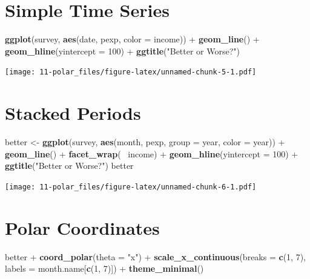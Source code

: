 \documentclass[]{book}
\newenvironment{Shaded}{\begin{snugshade}}{\end{snugshade}}
\newcommand{\KeywordTok}[1]{\textcolor[rgb]{0.13,0.29,0.53}{\textbf{{#1}}}}
\newcommand{\DataTypeTok}[1]{\textcolor[rgb]{0.13,0.29,0.53}{{#1}}}
\newcommand{\DecValTok}[1]{\textcolor[rgb]{0.00,0.00,0.81}{{#1}}}
\newcommand{\StringTok}[1]{\textcolor[rgb]{0.31,0.60,0.02}{{#1}}}
\newcommand{\NormalTok}[1]{{#1}}
\theoremstyle{definition}
\theoremstyle{definition}
\theoremstyle{remark}
\begin{document}
\section{Simple Time Series}\label{simple-time-series}

\begin{Shaded}
\begin{Highlighting}[]
\KeywordTok{ggplot}\NormalTok{(survey, }\KeywordTok{aes}\NormalTok{(date, pexp, }\DataTypeTok{color =} \NormalTok{income)) +}\StringTok{ }
\StringTok{  }\KeywordTok{geom_line}\NormalTok{() +}\StringTok{ }
\StringTok{  }\KeywordTok{geom_hline}\NormalTok{(}\DataTypeTok{yintercept =} \DecValTok{100}\NormalTok{) +}
\StringTok{  }\KeywordTok{ggtitle}\NormalTok{(}\StringTok{"Better or Worse?"}\NormalTok{)}
\end{Highlighting}
\end{Shaded}

\texttt{[image: 11-polar\_files/figure-latex/unnamed-chunk-5-1.pdf]}

\section{Stacked Periods}\label{stacked-periods}

\begin{Shaded}
\begin{Highlighting}[]
\NormalTok{better <-}\StringTok{ }\KeywordTok{ggplot}\NormalTok{(survey, }\KeywordTok{aes}\NormalTok{(month, pexp, }\DataTypeTok{group =} \NormalTok{year, }\DataTypeTok{color =} \NormalTok{year)) +}
\StringTok{  }\KeywordTok{geom_line}\NormalTok{() +}\StringTok{ }
\StringTok{  }\KeywordTok{facet_wrap}\NormalTok{(~}\StringTok{ }\NormalTok{income) +}
\StringTok{  }\KeywordTok{geom_hline}\NormalTok{(}\DataTypeTok{yintercept =} \DecValTok{100}\NormalTok{) +}
\StringTok{  }\KeywordTok{ggtitle}\NormalTok{(}\StringTok{"Better or Worse?"}\NormalTok{)}
\NormalTok{better}
\end{Highlighting}
\end{Shaded}

\texttt{[image: 11-polar\_files/figure-latex/unnamed-chunk-6-1.pdf]}

\section{Polar Coordinates}\label{polar-coordinates}

\begin{Shaded}
\begin{Highlighting}[]
\NormalTok{better +}\StringTok{ }
\StringTok{  }\KeywordTok{coord_polar}\NormalTok{(}\DataTypeTok{theta =} \StringTok{"x"}\NormalTok{) +}\StringTok{ }
\StringTok{  }\KeywordTok{scale_x_continuous}\NormalTok{(}\DataTypeTok{breaks =} \KeywordTok{c}\NormalTok{(}\DecValTok{1}\NormalTok{, }\DecValTok{7}\NormalTok{), }\DataTypeTok{labels =} \NormalTok{month.name[}\KeywordTok{c}\NormalTok{(}\DecValTok{1}\NormalTok{, }\DecValTok{7}\NormalTok{)]) +}
\StringTok{  }\KeywordTok{theme_minimal}\NormalTok{()}
\end{Highlighting}
\end{Shaded}
\end{document}
